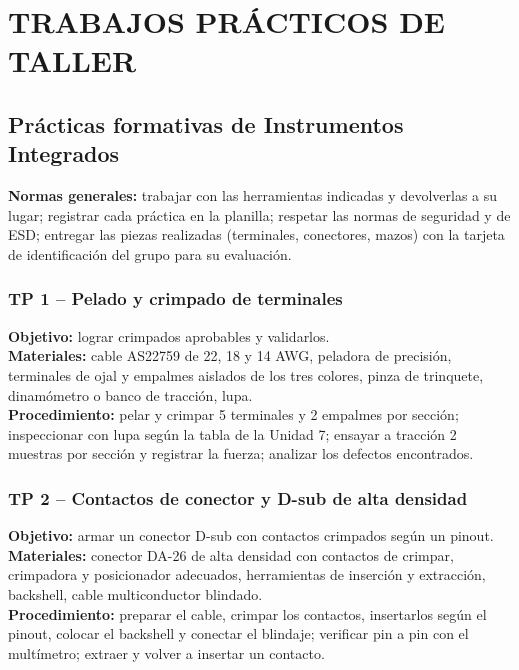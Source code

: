 \clearpage
\section*{TRABAJOS PRÁCTICOS DE TALLER}
\subsection*{Prácticas formativas de Instrumentos Integrados}

\begin{recuadro}
\textbf{Normas generales:} trabajar con las herramientas indicadas y devolverlas a su lugar;
registrar cada práctica en la planilla; respetar las normas de seguridad y de ESD; entregar las
piezas realizadas (terminales, conectores, mazos) con la tarjeta de identificación del grupo para
su evaluación.
\end{recuadro}

\subsubsection*{TP 1 -- Pelado y crimpado de terminales}
\textbf{Objetivo:} lograr crimpados aprobables y validarlos.\\
\textbf{Materiales:} cable AS22759 de 22, 18 y 14 AWG, peladora de precisión, terminales de ojal y
empalmes aislados de los tres colores, pinza de trinquete, dinamómetro o banco de tracción, lupa.\\
\textbf{Procedimiento:} pelar y crimpar 5 terminales y 2 empalmes por sección; inspeccionar con lupa
según la tabla de la Unidad 7; ensayar a tracción 2 muestras por sección y registrar la fuerza;
analizar los defectos encontrados.

\subsubsection*{TP 2 -- Contactos de conector y D-sub de alta densidad}
\textbf{Objetivo:} armar un conector D-sub con contactos crimpados según un pinout.\\
\textbf{Materiales:} conector DA-26 de alta densidad con contactos de crimpar, crimpadora y
posicionador adecuados, herramientas de inserción y extracción, backshell, cable multiconductor
blindado.\\
\textbf{Procedimiento:} preparar el cable, crimpar los contactos, insertarlos según el pinout,
colocar el backshell y conectar el blindaje; verificar pin a pin con el multímetro; extraer y volver
a insertar un contacto.

